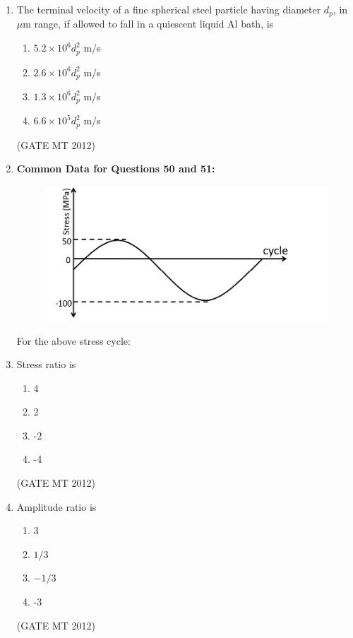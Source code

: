\documentclass[journal, 11pt, onecolumn]{IEEEtran}
\theoremstyle{remark}
\begin{document}
\begin{enumerate}
\begin{enumerate}
\item The terminal velocity of a fine spherical steel particle having diameter $d_p$, in $\mu$m range, if allowed to fall in a quiescent liquid Al bath, is
\begin{multicols}{2}
\begin{enumerate}  
\item $5.2 \times 10^6 d_p^2$ m/s
\item $2.6 \times 10^6 d_p^2$ m/s
\item $1.3 \times 10^6 d_p^2$ m/s
\item $6.6 \times 10^5 d_p^2$ m/s
\end{enumerate}
\end{multicols}
\hfill(GATE MT 2012)

\item[] \textbf{Common Data for Questions 50 and 51:} 

\begin{figure}
    \centering
    \includegraphics[width=0.5\linewidth]{figs/image3.png}
    \caption{}
    \label{fig:placeholder}
\end{figure}

For the above stress cycle:

\item Stress ratio is
\begin{multicols}{2}
\begin{enumerate}  
\item 4
\item 2
\item -2
\item -4
\end{enumerate}
\end{multicols}
\hfill(GATE MT 2012)

\item Amplitude ratio is
\begin{multicols}{2}
\begin{enumerate}  
\item 3
\item $1/3$
\item $-1/3$
\item -3
\end{enumerate}
\end{multicols}
\hfill(GATE MT 2012)


\end{enumerate}
\end{enumerate}
\end{document}
